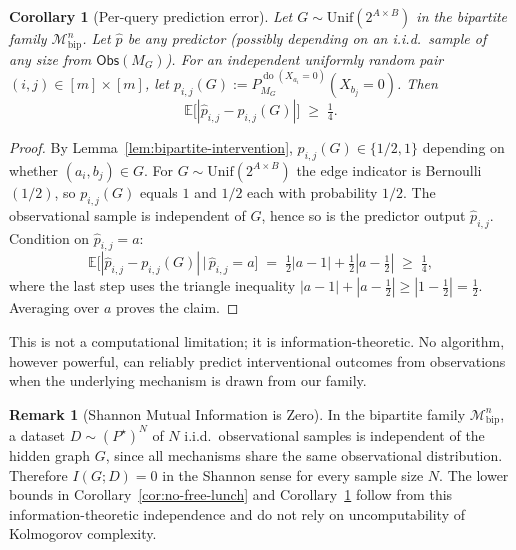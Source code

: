 \documentclass{article}
\theoremstyle{plain}
\newtheorem{corollary}[theorem]{Corollary}
\theoremstyle{definition}
\newtheorem{remark}[theorem]{Remark}
\newcommand{\E}{\mathbb{E}}
\newcommand{\calM}{\mathcal{M}}
\newcommand{\Obs}{\mathsf{Obs}}
\DeclareMathOperator{\doop}{do}
\begin{document}
\begin{corollary}[Per-query prediction error]
\label{cor:per-query-error}
Let $G \sim \mathrm{Unif}(2^{A \times B})$ in the bipartite family $\calM_{\mathrm{bip}}^n$. Let $\hat{p}$ be any predictor (possibly depending on an i.i.d.\ sample of any size from $\Obs(M_G)$). For an independent uniformly random pair $(i,j) \in [m] \times [m]$, let $p_{i,j}(G) := P_{M_G}^{\doop(X_{a_i} = 0)}(X_{b_j} = 0)$. Then
\[
\E\bigl[|\hat{p}_{i,j} - p_{i,j}(G)|\bigr] \;\geq\; \tfrac{1}{4}.
\]
\end{corollary}

\begin{proof}
By Lemma~\ref{lem:bipartite-intervention}, $p_{i,j}(G) \in \{1/2, 1\}$ depending on whether $(a_i, b_j) \in G$. For $G \sim \mathrm{Unif}(2^{A \times B})$ the edge indicator is Bernoulli$(1/2)$, so $p_{i,j}(G)$ equals $1$ and $1/2$ each with probability $1/2$. The observational sample is independent of $G$, hence so is the predictor output $\hat{p}_{i,j}$. Condition on $\hat{p}_{i,j} = a$:
\[
\E\bigl[|\hat{p}_{i,j} - p_{i,j}(G)| \,\big|\, \hat{p}_{i,j} = a\bigr] \;=\; \tfrac{1}{2} |a - 1| + \tfrac{1}{2} |a - \tfrac{1}{2}| \;\geq\; \tfrac{1}{4},
\]
where the last step uses the triangle inequality $|a-1| + |a-\tfrac{1}{2}| \geq |1 - \tfrac{1}{2}| = \tfrac{1}{2}$. Averaging over $a$ proves the claim.
\end{proof}

This is not a computational limitation; it is information-theoretic. No algorithm, however powerful, can reliably predict interventional outcomes from observations when the underlying mechanism is drawn from our family.

\begin{remark}[Shannon Mutual Information is Zero]
\label{rem:mutual-info}
In the bipartite family $\calM_{\mathrm{bip}}^n$, a dataset $D \sim (P^\star)^N$ of $N$ i.i.d.\ observational samples is independent of the hidden graph $G$, since all mechanisms share the same observational distribution. Therefore $I(G; D) = 0$ in the Shannon sense for every sample size $N$. The lower bounds in Corollary~\ref{cor:no-free-lunch} and Corollary~\ref{cor:per-query-error} follow from this information-theoretic independence and do not rely on uncomputability of Kolmogorov complexity.
\end{remark}

\end{document}

